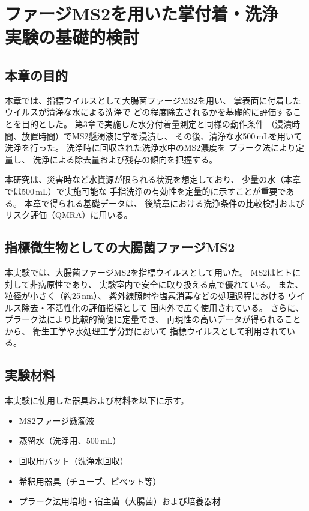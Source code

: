 

\chapter[
ファージMS2を用いた掌付着・洗浄実験の基礎的検討
]{
ファージMS2を用いた掌付着・洗浄\\
\hspace{4.1em}実験の基礎的検討
}

\section{本章の目的}
本章では、指標ウイルスとして大腸菌ファージMS2を用い、
掌表面に付着したウイルスが清浄な水による洗浄で
どの程度除去されるかを基礎的に評価することを目的とした。
第3章で実施した水分付着量測定と同様の動作条件
（浸漬時間、放置時間）でMS2懸濁液に掌を浸漬し、
その後、清浄な水500\,mLを用いて洗浄を行った。
洗浄時に回収された洗浄水中のMS2濃度を
プラーク法により定量し、
洗浄による除去量および残存の傾向を把握する。

本研究は、災害時など水資源が限られる状況を想定しており、
少量の水（本章では500\,mL）で実施可能な
手指洗浄の有効性を定量的に示すことが重要である。
本章で得られる基礎データは、
後続章における洗浄条件の比較検討および
リスク評価（QMRA）に用いる。


\section{指標微生物としての大腸菌ファージMS2}
本実験では、大腸菌ファージMS2を指標ウイルスとして用いた。
MS2はヒトに対して非病原性であり、
実験室内で安全に取り扱える点で優れている。
また、粒径が小さく（約25\,nm）、
紫外線照射や塩素消毒などの処理過程における
ウイルス除去・不活性化の評価指標として
国内外で広く使用されている。
さらに、プラーク法により比較的簡便に定量でき、
再現性の高いデータが得られることから、
衛生工学や水処理工学分野において
指標ウイルスとして利用されている。

\clearpage
\section{実験材料}
本実験に使用した器具および材料を以下に示す。
\begin{itemize}
  \item MS2ファージ懸濁液
  \item 蒸留水（洗浄用、500\,mL）
  \item 回収用バット（洗浄水回収）
  \item 希釈用器具（チューブ、ピペット等）
  \item プラーク法用培地・宿主菌（大腸菌）および培養器材
\end{itemize}

